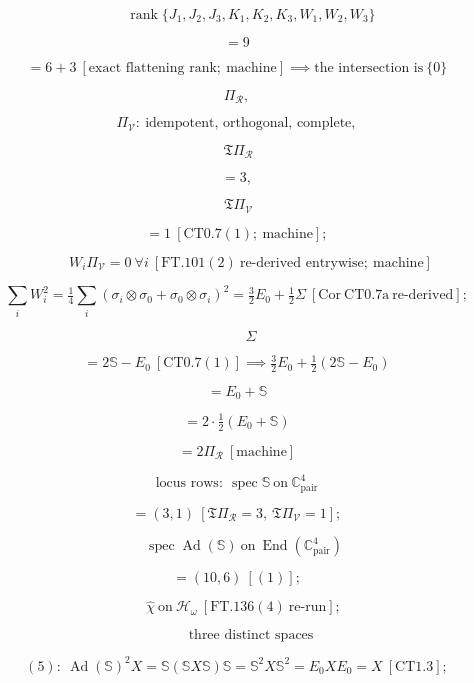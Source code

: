 \begin{theorem}
\[
\qquad \operatorname{rank}\{J_1,J_2,J_3,K_1,K_2,K_3,W_1,W_2,W_3\}
\]

\[
= 9
\]

\[
= 6+3\ [\text{exact flattening rank};\ \text{machine}]\implies\text{the intersection is}\ \{0\}
\]

\[
\Pi_{\mathcal R},
\]

\[
\Pi_{\mathcal V}:\ \text{idempotent, orthogonal, complete},
\]

\[
\ \mathfrak T\Pi_{\mathcal R}
\]

\[
= 3,
\]

\[
\ \mathfrak T\Pi_{\mathcal V}
\]

\[
= 1\ [\mathrm{CT0.7}(1);\ \text{machine}];
\]

\[
\qquad W_i\Pi_{\mathcal V}=0\ \forall i\ [\mathrm{FT.101}(2)\ \text{re-derived entrywise};\ \text{machine}]
\]

\[
\textstyle\sum_iW_i^2=\tfrac14\sum_i(\sigma_i\otimes\sigma_0+\sigma_0\otimes\sigma_i)^2=\tfrac32E_0+\tfrac12\Sigma\ [\mathrm{Cor}\ \mathrm{CT0.7a}\ \text{re-derived}];
\]

\[
\qquad \Sigma
\]

\[
= 2\mathbb S-E_0\ [\mathrm{CT0.7}(1)]\implies\tfrac32E_0+\tfrac12(2\mathbb S-E_0)
\]

\[
= E_0+\mathbb S
\]

\[
= 2\cdot\tfrac12(E_0+\mathbb S)
\]

\[
= 2\Pi_{\mathcal R}\ [\text{machine}]
\]

\[
\text{locus rows}:\ \operatorname{spec}\mathbb S\ \text{on}\ \mathbb C^4_{\mathrm{pair}}
\]

\[
= (3,1)\ [\mathfrak T\Pi_{\mathcal R}=3,\ \mathfrak T\Pi_{\mathcal V}=1];
\]

\[
\quad\operatorname{spec}\operatorname{Ad}(\mathbb S)\ \text{on}\ \operatorname{End}(\mathbb C^4_{\mathrm{pair}})
\]

\[
= (10,6)\ [(1)];
\]

\[
\quad\hat\chi\ \text{on}\ \mathcal H_\omega\ [\mathrm{FT.136}(4)\ \text{re-run}];
\]

\[
\qquad \text{three distinct spaces}
\]

\[
(5):\ \operatorname{Ad}(\mathbb S)^2X=\mathbb S(\mathbb SX\mathbb S)\mathbb S=\mathbb S^2X\mathbb S^2=E_0XE_0=X\ [\mathrm{CT1.3}];
\]


\end{theorem}

